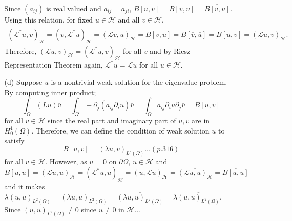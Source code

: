 \documentclass{article}
\begin{document}
\begin{enumerate}
\begin{enumerate}
Since $(a_{ij})$ is real valued and $a_{ij}=a_{ji}$, $B[u,v]=B[\overline{v},\overline{u}]=\overline{B[v,u]}$. Using this relation, for fixed $u\in\mathcal{H}$ and all $v\in \mathcal{H}$,
\begin{equation*}
\begin{split}
(\mathcal{L}^*u, v)_{\mathcal{H}}=\overline{(v,\mathcal{L}^*u)_{\mathcal{H}}}=\overline{(\mathcal{L}v,u)_{\mathcal{H}}}=\overline{B[v,u]}=B[\overline{v},\overline{u}] =B[u,v] =(\mathcal{L}u,v)_{\mathcal{H}}.
\end{split}
\end{equation*}
Therefore, $(\mathcal{L}u,v)_{\mathcal{H}}=(\mathcal{L}^*u,v)_{\mathcal{H}}$ for all $v$ and by Riesz Representation Theorem again, $\mathcal{L}^*u=\mathcal{L}u$ for all $u\in \mathcal{H}$.
\item[(d)] Suppose $u$ is a nontrivial weak solution for the eigenvalue problem. By computing inner product;
\begin{equation*}
\int_\Omega (Lu)\overline{v}=\int_\Omega -\partial_j(a_{ij}\partial_i u)\overline{v}=\int_\Omega a_{ij}\partial_i u\partial_j \overline{v}=B[u,v]
\end{equation*}
for all $v\in \mathcal{H}$ since the real part and imaginary part of $u,v$ are in $H^1_0(\Omega)$. Therefore, we can define the condition of weak solution $u$ to satisfy
\begin{equation*}
B[u,v]=(\lambda u,v)_{L^2(\Omega)}...(p.316)
\end{equation*}
for all $v\in\mathcal{H}$. However, as $u=0$ on $\partial \Omega$, $u\in \mathcal{H}$ and
\begin{equation*}
B[u,u]=(\mathcal{L}u,u)_{\mathcal{H}}=(\mathcal{L}^*u,u)_{\mathcal{H}}=(u,\mathcal{L}u)_{\mathcal{H}}=\overline{(\mathcal{L}u,u)_{\mathcal{H}}}=\overline{B[u,u]}
\end{equation*}
and it makes $\lambda(u,u)_{L^2(\Omega)}=(\lambda u,u)_{L^2(\Omega)}=\overline{(\lambda u,u)_{L^2(\Omega)}}=\overline{\lambda}\overline{(u,u)_{L^2(\Omega)}}$. Since $(u,u)_{L^2(\Omega)}\neq 0$ since $u\neq 0$ in $\mathcal{H}$...
\end{enumerate}
\end{enumerate}
\end{document}
